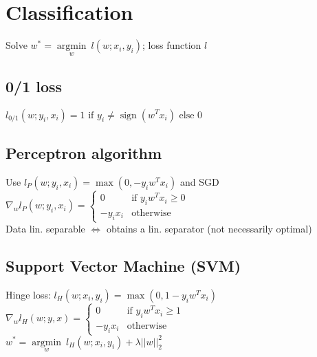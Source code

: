 \section*{Classification}

Solve $w^* = \underset{w}{\operatorname{argmin}} ~ l(w;x_i,y_i)$; loss function
$l$

\subsection*{0/1 loss}
$l_{0/1} (w;y_i,x_i) = 1 \text{ if } y_i \neq \operatorname{sign}(w^Tx_i) \text{ else } 0$

\subsection*{Perceptron algorithm}
Use $l_P (w;y_i,x_i) = \operatorname{max}(0, -y_i w^T x_i)$ and SGD\\ $\nabla_w
    l_P(w;y_i,x_i) =
    \begin{cases}
        0        & \text{if } y_i w^T x_i \geq 0 \\
        -y_i x_i & \text{otherwise}
    \end{cases}$ \\
Data lin. separable $\Leftrightarrow$ obtains a lin. separator (not necessarily optimal)

\subsection*{Support Vector Machine (SVM)}
Hinge loss: $l_H(w;x_i,y_i) = \operatorname{max}(0,1-y_i w^T x_i)$ \\ $\nabla_w
    l_H(w;y,x) =
    \begin{cases}
        0        & \text{if } y_i w^T x_i \geq 1 \\
        -y_i x_i & \text{otherwise}
    \end{cases}$\\
$w^* = \underset{w}{\operatorname{argmin}} ~ l_H(w;x_i,y_i) + \lambda||w||_2^2$
